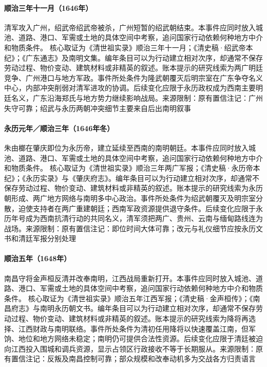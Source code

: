 \hypertarget{civic:EQ-1646-SHAOWU-GUANGZHOU}{}\paragraph{顺治三年十一月（1646年）}清军攻入广州，绍武帝绍武帝被杀，广州短暂的绍武朝结束。本事件应同时放入城池、道路、港口、军需或土地的具体空间中考察，追问国家行动依赖何种地方中介和物质条件。 核心取证为《清世祖实录》顺治三年十一月；《清史稿·绍武帝本纪》；《广东通志》及南明文集。编年条目可以为行动建立相对次序，却通常不保存劳动过程、物价变动、建筑材料或非精英的叙述。账本提示的研究线索为两广明廷竞争、广州港口与地方军政。事件所处条件为隆武朝覆灭后明宗室在广东争夺名义中心，内部冲突削弱对清军进攻的协调。后续变化应限于永历政权成为西南主要明廷名义，广东沿海郑氏与地方势力继续影响战局。来源限制：原有置信注记：广州失守可靠；绍武与永历两朝冲突细节主要来自后出南明叙事
\hypertarget{civic:EQ-1646-YONGLI-ZHAOQING}{}\paragraph{永历元年／顺治三年（1646年冬）}朱由榔在肇庆即位为永历帝，建立延续至西南的南明朝廷。本事件应同时放入城池、道路、港口、军需或土地的具体空间中考察，追问国家行动依赖何种地方中介和物质条件。 核心取证为《清世祖实录》顺治三年两广军报；《清史稿·永历帝本纪》；《永历实录》与《肇庆府志》。编年条目可以为行动建立相对次序，却通常不保存劳动过程、物价变动、建筑材料或非精英的叙述。账本提示的研究线索为永历朝形成、两广地方网络与南明多中心政治。事件所处条件为绍武朝覆灭及明宗室分散，迫使支持者在两广重建朝廷；西南军政资源提供退守条件。后续变化应限于永历年号成为西南抗清行动的共同名义，清军须把两广、贵州、云南与缅甸路线连为战场。来源限制：原有置信注记：即位时间大体可靠；改元与礼仪细节应按永历文书和清廷军报分别处理
\hypertarget{civic:EQ-1648-JIN-SHENGHUAN}{}\paragraph{顺治五年（1648年）}南昌守将金声桓反清并改奉南明，江西战局重新打开。本事件应同时放入城池、道路、港口、军需或土地的具体空间中考察，追问国家行动依赖何种地方中介和物质条件。 核心取证为《清世祖实录》顺治五年江西军报；《清史稿·金声桓传》；《南昌府志》与南明永历朝文书。编年条目可以为行动建立相对次序，却通常不保存劳动过程、物价变动、建筑材料或非精英的叙述。账本提示的研究线索为降将再选择、江西财政与南明联络。事件所处条件为清初任用降将以快速覆盖江南，但军饷、地位和地方网络未稳定；南明仍可提供合法性资源。后续变化应限于清廷被迫向江西投入围城和调兵资源，显示占领区行政接收不等于长期服从。来源限制：原有置信注记：反叛及南昌控制可靠；部众规模和改奉动机多为交战各方归责语言
